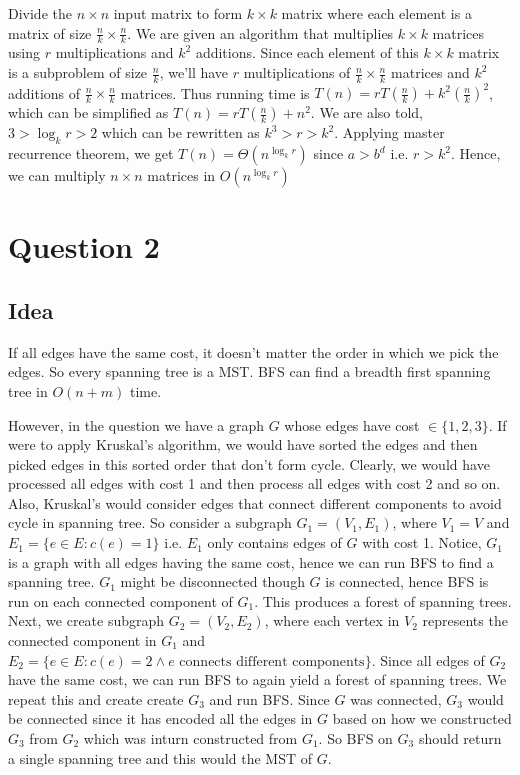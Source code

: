 \documentclass{article}
\begin{document}
    Divide the $n \times n$ input matrix to form $k \times k$ matrix where each element is a matrix of size $\frac{n}{k} \times \frac{n}{k}$. We are given an algorithm that multiplies $k \times k$ matrices using $r$ multiplications and $k^2$ additions. Since each element of this $k \times k$ matrix is a subproblem of size $\frac{n}{k}$, we'll have $r$ multiplications of $\frac{n}{k} \times \frac{n}{k}$ matrices and $k^2$ additions of $\frac{n}{k} \times \frac{n}{k}$ matrices. Thus running time is $T(n) = rT(\frac{n}{k}) + k^2 (\frac{n}{k})^2$, which can be simplified as $T(n) = rT(\frac{n}{k}) + n^2$. We are also told, $3 > \log_k r > 2$ which can be rewritten as $k^3 > r > k^2$. Applying master recurrence theorem, we get $T(n) = \Theta(n^{\log_k r})$ since $a > b^d$ i.e. $r > k^2$. Hence, we can multiply $n \times n$ matrices in $O(n^{\log_k r})$

    \section*{Question 2}

    \subsection*{Idea}
    If all edges have the same cost, it doesn't matter the order in which we pick the edges. So every spanning tree is a MST. BFS can find a breadth first spanning tree in $O(n+m)$ time.
    
    However, in the question we have a graph $G$ whose edges have cost $\in \{1, 2, 3\}$. If were to apply Kruskal's algorithm, we would have sorted the edges and then picked edges in this sorted order that don't form cycle. Clearly, we would have processed all edges with cost 1 and then process all edges with cost 2 and so on. Also, Kruskal's would consider edges that connect different components to avoid cycle in spanning tree. So consider a subgraph $G_1 = (V_1, E_1)$, where $V_1 = V$ and $E_1 = \{e \in E : c(e) = 1\}$ i.e. $E_1$ only contains edges of $G$ with cost 1. Notice, $G_1$ is a graph with all edges having the same cost, hence we can run BFS to find a spanning tree. $G_1$ might be disconnected though $G$ is connected, hence BFS is run on each connected component of $G_1$. This produces a forest of spanning trees. Next, we create subgraph $G_2 = (V_2, E_2)$, where each vertex in $V_2$ represents the connected component in $G_1$ and $E_2 = \{e \in E : c(e) = 2 \land \text{$e$ connects different components}\}$. Since all edges of $G_2$ have the same cost, we can run BFS to again yield a forest of spanning trees. We repeat this and create create $G_3$ and run BFS. Since $G$ was connected, $G_3$ would be connected since it has encoded all the edges in $G$ based on how we constructed $G_3$ from $G_2$ which was inturn constructed from $G_1$. So BFS on $G_3$ should return a single spanning tree and this would the MST of $G$.
    
\end{document}
